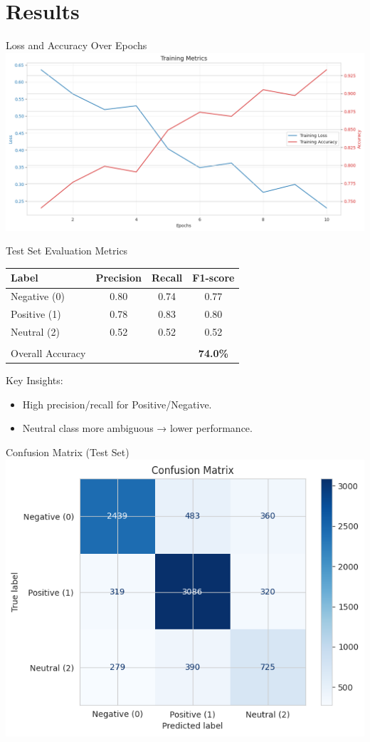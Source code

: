 \documentclass[aspectratio=169]{beamer}
\begin{document}
\section{Results}
\begin{frame}{Loss and Accuracy Over Epochs}
  \centering
  \includegraphics[width=0.75\linewidth]{training_metrics.png}
\end{frame}

\begin{frame}{Test Set Evaluation Metrics}
  \vspace{-0.5em}
  {\small
    \begin{tabular}{lccc}
      Label            & Precision & Recall & F1-score     \\
      \hline
      Negative (0)     & 0.80      & 0.74   & 0.77         \\
      Positive (1)     & 0.78      & 0.83   & 0.80         \\
      Neutral (2)      & 0.52      & 0.52   & 0.52         \\
      \\[-0.8em]
      Overall Accuracy &           &        & {\bf 74.0\%} \\
    \end{tabular}}

  \vspace{1em}

  Key Insights:
  \begin{itemize}
    \item High precision/recall for Positive/Negative.
    \item Neutral class more ambiguous → lower performance.
  \end{itemize}
\end{frame}

\begin{frame}{Confusion Matrix (Test Set)}
  \centering
  \includegraphics[width=0.65\linewidth]{confusion_matrix.png}
\end{frame}
\end{document}
